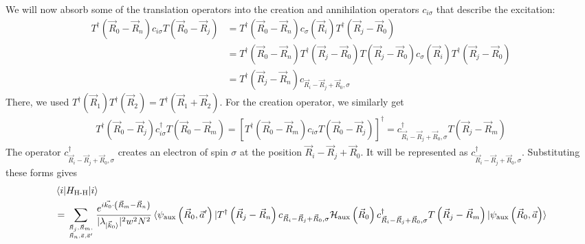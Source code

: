 \documentclass{report}
\numberwithin{equation}{section}
\begin{document}
We will now absorb some of the translation operators into the creation and annihilation operators \(c_{i\sigma}\) that describe the excitation:
\begin{equation}\begin{aligned}
	T^\dagger\left( \vec R_0 - \vec R_n \right) c_{i\sigma} T\left( \vec R_0 - \vec R_j \right) &= T^\dagger\left( \vec R_0 - \vec R_n \right) c_{\sigma}\left( \vec R_i \right)  T^\dagger\left(\vec R_j - \vec R_0\right) \\
												    &= T^\dagger\left( \vec R_0 - \vec R_n \right) T^\dagger \left(\vec R_j - \vec R_0\right) T\left(\vec R_j - \vec R_0\right) c_{\sigma}\left( \vec R_i \right)  T^\dagger\left(\vec R_j - \vec R_0\right)\\
												    &=T^\dagger\left(\vec R_j - \vec R_n\right) c_{\vec R_i - \vec R_j + \vec R_0,\sigma}
\end{aligned}\end{equation}
There, we used \(T^\dagger(\vec R_1) T^\dagger (\vec R_2) = T^\dagger(\vec R_1 + \vec R_2)\). For the creation operator, we similarly get
\begin{equation}\begin{aligned}
	T^\dagger\left( \vec R_0 - \vec R_j \right) c^\dagger_{i\sigma} T\left( \vec R_0 - \vec R_m \right) = \left[T^\dagger\left( \vec R_0 - \vec R_m \right) c_{i\sigma} T\left( \vec R_0 - \vec R_j \right)\right]^\dagger = c^\dagger_{\vec R_i - \vec R_j + \vec R_0,\sigma} T\left(\vec R_j - \vec R_m\right)
\end{aligned}\end{equation}
The operator \(c^\dagger_{\vec R_i - \vec R_j + \vec R_0,\sigma}\) creates an electron of spin \(\sigma\) at the position \(\vec R_i - \vec R_j + \vec R_0\). It will be represented as \(c^\dagger_{\vec R_i - \vec R_j + \vec R_0,\sigma}\). Substituting these forms gives
\begin{equation}\begin{aligned}
	&\braket{i | H_\text{H-H} | i} \\
	&= \sum_{\vec R_j, \vec R_m, \atop{\vec R_n, \vec a, \vec a^\prime}} \frac{e^{i\vec{k_0}\cdot\left(\vec{R}_m - \vec R_n\right)}}{|\lambda_{\ket{\vec k_0}}|^2 w^2 N^2} \braket{\psi_\text{aux}\left( \vec R_0, \vec a^\prime\right) | T^\dagger\left(\vec R_j - \vec R_n\right) c_{\vec R_i - \vec R_j + \vec R_0,\sigma}\mathcal{H}_\text{aux}\left( \vec R_0 \right)c^\dagger_{\vec R_i - \vec R_j + \vec R_0,\sigma} T\left(\vec R_j - \vec R_m\right)| \psi_\text{aux}\left( \vec R_0, \vec a \right)}
\end{aligned}\end{equation}
\end{document}
